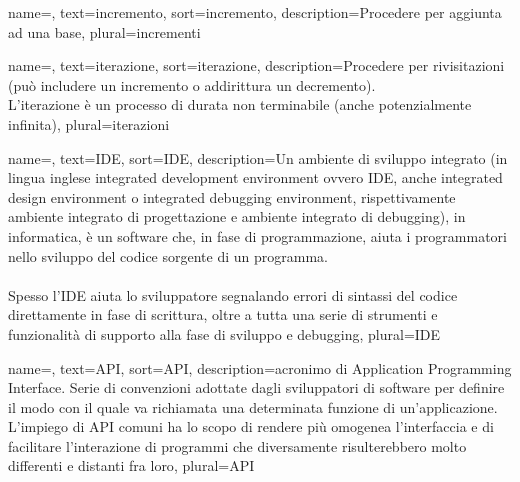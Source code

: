 
\renewcommand{\acronymname}{Acronimi e abbreviazioni}




{
    name=,
    text=incremento,
    sort=incremento,
    description={Procedere per aggiunta ad una base},
    plural=incrementi
}

{
    name=,
    text=iterazione,
    sort=iterazione,
    description={Procedere per rivisitazioni (può includere un incremento o addirittura un decremento).\\L'iterazione è un processo di durata non terminabile (anche potenzialmente infinita)},
    plural=iterazioni
}

{
	name=,
	text=IDE,
	sort=IDE,
	description={Un ambiente di sviluppo integrato (in lingua inglese integrated development environment ovvero IDE, anche integrated design environment o integrated debugging environment, rispettivamente ambiente integrato di progettazione e ambiente integrato di debugging), in informatica, è un software che, in fase di programmazione, aiuta i programmatori nello sviluppo del codice sorgente di un programma.\\ \\
	Spesso l'IDE aiuta lo sviluppatore segnalando errori di sintassi del codice direttamente in fase di scrittura, oltre a tutta una serie di strumenti e funzionalità di supporto alla fase di sviluppo e debugging\cite{site:wikipediaIDE}},
	plural=IDE
}


{
	name=,
	text=API,
	sort=API,
	description={acronimo di Application Programming Interface. Serie di convenzioni adottate dagli sviluppatori di software per definire il modo con il quale va richiamata una determinata funzione di un'applicazione. L'impiego di API comuni ha lo scopo di rendere più omogenea l'interfaccia e di facilitare l'interazione di programmi che diversamente risulterebbero molto differenti e distanti fra loro\cite{site:api}},
	plural=API
}


